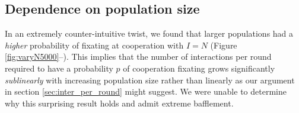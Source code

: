 \documentclass{amsart}
\begin{document}
\subsection{Dependence on population size}
\label{sec:pop_size}

In an extremely counter-intuitive twist, we found that larger
populations had a \emph{higher} probability of fixating at cooperation
with $I=N$ (Figure \ref{fig:varyN5000}--). This
implies that the number of interactions per round required to have a
probability $p$ of cooperation fixating grows significantly
\emph{sublinearly} with increasing population size rather than
linearly as our argument in section \ref{sec:inter_per_round} might
suggest. We were unable to determine why this surprising result holds
and admit extreme bafflement.
\end{document}
